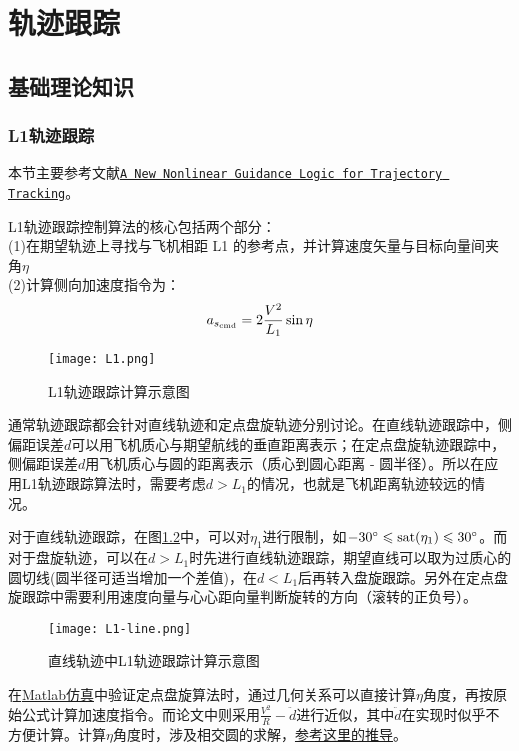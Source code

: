 \chapter{轨迹跟踪}
\section{基础理论知识}
\subsection{L1轨迹跟踪}
本节主要参考文献\href{attachment/A New Nonlinear Guidance Logic for Trajectory Tracking 6.2004-4900.pdf}{\texttt{A New Nonlinear Guidance Logic for Trajectory Tracking}}。

L1轨迹跟踪控制算法的核心包括两个部分：\\
(1)在期望轨迹上寻找与飞机相距 L1 的参考点，并计算速度矢量与目标向量间夹角$\eta$\\
(2)计算侧向加速度指令为：
\begin{equation}
    a_{s_\rm{cmd}} = 2 \frac {V^2}{L_1} \sin\eta
\end{equation}
\begin{figure}[htbp]
	\figskip
	\centering
	\texttt{[image: L1.png]}	  
	\caption{\label{fig: L1} L1轨迹跟踪计算示意图}
\end{figure}

通常轨迹跟踪都会针对直线轨迹和定点盘旋轨迹分别讨论。在直线轨迹跟踪中，侧偏距误差$d$可以用飞机质心与期望航线的垂直距离表示；在定点盘旋轨迹跟踪中，侧偏距误差$d$用飞机质心与圆的距离表示（质心到圆心距离 - 圆半径）。所以在应用L1轨迹跟踪算法时，需要考虑$d>L_1$的情况，也就是飞机距离轨迹较远的情况。

对于直线轨迹跟踪，在图\ref{fig: L1-line}中，可以对$\eta_1$进行限制，如$-30^\circ \le \rm{sat}(\eta_1) \le 30^\circ$。而对于盘旋轨迹，可以在$d>L_1$时先进行直线轨迹跟踪，期望直线可以取为过质心的圆切线(圆半径可适当增加一个差值)，在$d<L_1$后再转入盘旋跟踪。另外在定点盘旋跟踪中需要利用速度向量与心心距向量判断旋转的方向（滚转的正负号）。

\begin{figure}[htbp]
	\figskip 
	\centering
	\texttt{[image: L1-line.png]}	  
	\caption{\label{fig: L1-line} 直线轨迹中L1轨迹跟踪计算示意图}
\end{figure}

在\href{attachment/L1t.m}{Matlab仿真}中验证定点盘旋算法时，通过几何关系可以直接计算$\eta$角度，再按原始公式计算加速度指令。而论文中则采用$\frac{V^2}{R} - \ddot{d}$进行近似，其中$\ddot{d}$在实现时似乎不方便计算。计算$\eta$角度时，涉及相交圆的求解，\href{http://blog.csdn.net/zx3517288/article/details/53326420}{参考这里的推导}。

